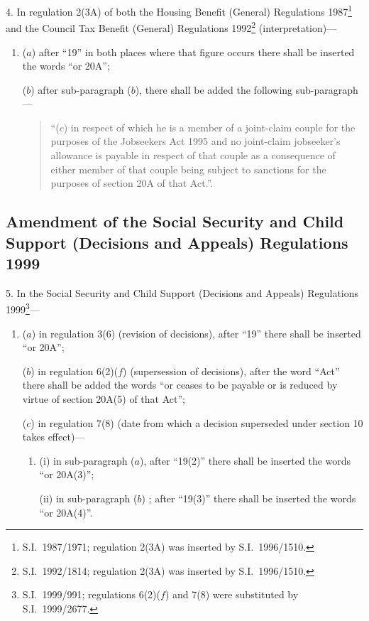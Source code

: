 \documentclass[12pt,a4paper]{article}
\begin{document}
4.  In regulation 2(3A) of both the Housing Benefit (General) Regulations 1987\footnote{S.I.\ 1987/1971; regulation 2(3A) was inserted by S.I.\ 1996/1510.} and the Council Tax Benefit (General) Regulations 1992\footnote{S.I.\ 1992/1814; regulation 2(3A) was inserted by S.I.\ 1996/1510.} (interpretation)—
\begin{enumerate}\item[]
($a$) after “19” in both places where that figure occurs there shall be inserted the words “or 20A”;

($b$) after sub-paragraph ($b$), there shall be added the following sub-paragraph—
\begin{quotation}
“($c$) in respect of which he is a member of a joint-claim couple for the purposes of the Jobseekers Act 1995 and no joint-claim jobseeker’s allowance is payable in respect of that couple as a consequence of either member of that couple being subject to sanctions for the purposes of section 20A of that Act.”.
\end{quotation}
\end{enumerate}

\subsection[5. Amendment of the Social Security and Child Support (Decisions and Appeals) Regulations 1999]{Amendment of the Social Security and Child Support (Decisions and Appeals) Regulations 1999}

5.  In the Social Security and Child Support (Decisions and Appeals) Regulations 1999\footnote{S.I.\ 1999/991; regulations 6(2)($f$) and 7(8) were substituted by S.I.\ 1999/2677.}—
\begin{enumerate}\item[]
($a$) in regulation 3(6) (revision of decisions), after “19” there shall be inserted “or 20A”;

($b$) in regulation 6(2)($f$)  (supersession of decisions), after the word “Act” there shall be added the words “or ceases to be payable or is reduced by virtue of section 20A(5) of that Act”;

($c$) in regulation 7(8) (date from which a decision superseded under section 10 takes effect)—
\begin{enumerate}\item[]
(i) in sub-paragraph ($a$), after “19(2)” there shall be inserted the words “or 20A(3)”;

(ii) in sub-paragraph ($b$) ; after “19(3)” there shall be inserted the words “or 20A(4)”.
\end{enumerate}
\end{enumerate}
\end{document}
